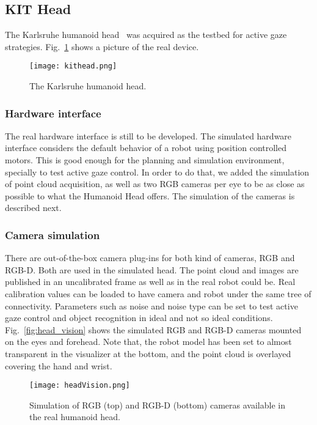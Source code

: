 \subsection{KIT Head}
\label{sec:kithead}

The Karlsruhe humanoid head~\cite{Asfour2008KITHead} was acquired as the testbed for active gaze strategies. Fig.~\ref{fig:kit_head} shows a picture of the real device.

\begin{figure}
\centering
\texttt{[image: kithead.png]}
\caption{The Karlsruhe humanoid head.}
\label{fig:kit_head}
\end{figure}

\subsubsection{Hardware interface}

The real hardware interface is still to be developed. The simulated hardware interface considers the default behavior of a robot using position controlled motors. This is good enough for the planning and simulation environment, specially to test active gaze control. In order to do that, we added the simulation of point cloud acquisition, as well as two RGB cameras per eye to be as close as possible to what the Humanoid Head offers. The simulation of the cameras is described next.

\subsubsection{Camera simulation}
There are out-of-the-box camera plug-ins for both kind of cameras, RGB and RGB-D. Both are used in the simulated head. The point cloud and images are published in an uncalibrated frame as well as in the real robot could be. Real calibration values can be loaded to have camera and robot  under the same tree of connectivity. Parameters such as noise and noise type can be set to test active gaze control and object recognition in ideal and not so ideal conditions. Fig.~\ref{fig:head_vision} shows the simulated RGB and RGB-D cameras mounted on the eyes and forehead. Note that, the robot model has been set to almost transparent in the visualizer at the bottom, and the point cloud is overlayed covering the hand and wrist.

\begin{figure}[h!]
\centering
\texttt{[image: headVision.png]}
\caption{Simulation of RGB (top) and RGB-D (bottom) cameras available in the real humanoid head.}
\label{fig:kit_vision}
\end{figure}